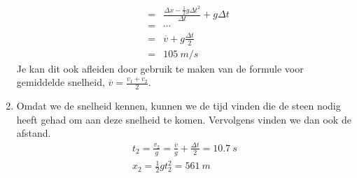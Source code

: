\begin{oplossing}
\begin{enumerate}
\begin{eqnarray*}
&=&\frac{\Delta x-\frac{1}{2}g\Delta t^2}{\Delta t}+g\Delta t\\
&=&\cdots\\
&=&\overline{v}+g\frac{\Delta t}{2}\\
&=&\SI{105}{m/s}
\end{eqnarray*}
Je kan dit ook afleiden door gebruik te maken van de formule voor gemiddelde snelheid, $\overline{v}=\frac{v_1+v_2}{2}$.
\item Omdat we de snelheid kennen, kunnen we de tijd vinden die de steen nodig heeft gehad om aan deze snelheid te komen. Vervolgens vinden we dan ook de afstand.
\begin{eqnarray*}
t_2=\frac{v_2}{g}=\frac{\overline{v}}{g}+\frac{\Delta t}{2}=\SI{10,7}{s}\\
x_2=\frac{1}{2}gt_2^2=\SI{561}{m}
\end{eqnarray*}
\end{enumerate}
\end{oplossing}